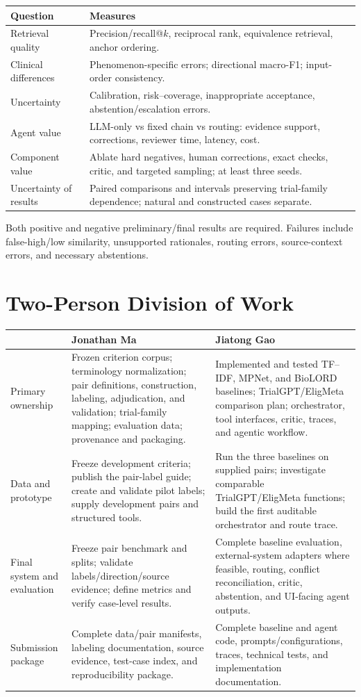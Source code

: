 \documentclass[10pt]{article}
\begin{document}
\begin{longtable}{p{.29\linewidth}p{.63\linewidth}}\toprule
Question & Measures\\\midrule
Retrieval quality & Precision/recall@$k$, reciprocal rank, equivalence retrieval, anchor ordering.\\
Clinical differences & Phenomenon-specific errors; directional macro-F1; input-order consistency.\\
Uncertainty & Calibration, risk--coverage, inappropriate acceptance, abstention/escalation errors.\\
Agent value & LLM-only vs fixed chain vs routing: evidence support, corrections, reviewer time, latency, cost.\\
Component value & Ablate hard negatives, human corrections, exact checks, critic, and targeted sampling; at least three seeds.\\
Uncertainty of results & Paired comparisons and intervals preserving trial-family dependence; natural and constructed cases separate.\\\bottomrule
\end{longtable}
Both positive and negative preliminary/final results are required. Failures include false-high/low similarity, unsupported rationales, routing errors, source-context errors, and necessary abstentions.

\section{Two-Person Division of Work}
\begin{longtable}{p{.17\linewidth}p{.37\linewidth}p{.37\linewidth}}\toprule
& Jonathan Ma & Jiatong Gao\\\midrule
Primary ownership & Frozen criterion corpus; terminology normalization; pair definitions, construction, labeling, adjudication, and validation; trial-family mapping; evaluation data; provenance and packaging. & Implemented and tested TF--IDF, MPNet, and BioLORD baselines; TrialGPT/EligMeta comparison plan; orchestrator, tool interfaces, critic, traces, and agentic workflow.\\
Data and prototype & Freeze development criteria; publish the pair-label guide; create and validate pilot labels; supply development pairs and structured tools. & Run the three baselines on supplied pairs; investigate comparable TrialGPT/EligMeta functions; build the first auditable orchestrator and route trace.\\
Final system and evaluation & Freeze pair benchmark and splits; validate labels/direction/source evidence; define metrics and verify case-level results. & Complete baseline evaluation, external-system adapters where feasible, routing, conflict reconciliation, critic, abstention, and UI-facing agent outputs.\\
Submission package & Complete data/pair manifests, labeling documentation, source evidence, test-case index, and reproducibility package. & Complete baseline and agent code, prompts/configurations, traces, technical tests, and implementation documentation.\\\bottomrule
\end{longtable}
\end{document}
